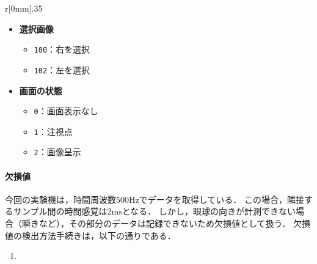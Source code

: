 \begin{wrapfigure}{r}[0mm]{.35\textwidth}
    \centering
    \begin{framed}
        \scriptsize
        \begin{minipage}[t]{.48\textwidth}
            \begin{itemize}
                \setlength{\leftskip}{-2em}
                \item {\bfseries 選択画像}
                      \begin{itemize}
                          \setlength{\leftskip}{-3em}
                          \item \texttt{100}：右を選択
                          \item \texttt{102}：左を選択
                      \end{itemize}
            \end{itemize}
        \end{minipage}
        \begin{minipage}[t]{.48\textwidth}
            \begin{itemize}
                \setlength{\leftskip}{-2em}
                \item {\bfseries 画面の状態}
                      \begin{itemize}
                          \setlength{\leftskip}{-3em}
                          \item \texttt{0}：画面表示なし
                          \item \texttt{1}：注視点
                          \item \texttt{2}：画像呈示
                      \end{itemize}
            \end{itemize}
        \end{minipage}
    \end{framed}
    \vspace{-1cm}
\end{wrapfigure}
\paragraph{欠損値}
今回の実験機\elt は，時間周波数\(500\textrm{Hz}\)でデータを取得している．
この場合，隣接するサンプル間の時間感覚は\(2\textrm{ms}\)となる．
しかし，眼球の向きが計測できない場合（瞬きなど），その部分のデータは記録できないため欠損値として扱う．
欠損値の検出方法手続きは，以下の通りである．
\begin{enumerate}
    \item
\end{enumerate}
